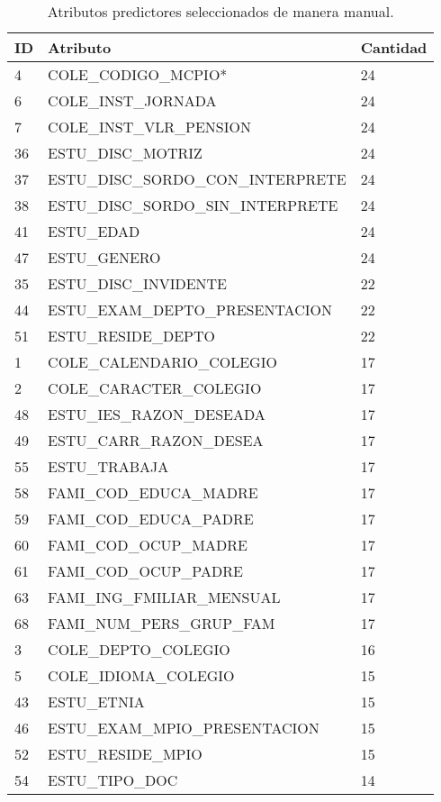 \begin{table}[!Hhtb]
\centering
\begin{tabular}{|p{0.5cm}|p{8cm}|p{1.8cm}|}
\hline
	\rowcolor[gray]{0.9} 
	\textbf{ID} &
	\textbf{Atributo} &
	\textbf{Cantidad}\\
\hline
4 & COLE_CODIGO_MCPIO* & 24 \\ \hline
6 & COLE\_INST\_JORNADA & 24 \\ \hline
7 & COLE\_INST\_VLR\_PENSION & 24 \\ \hline
36 & ESTU\_DISC\_MOTRIZ & 24 \\ \hline
37 & ESTU\_DISC\_SORDO\_CON\_INTERPRETE & 24 \\ \hline
38 & ESTU\_DISC\_SORDO\_SIN\_INTERPRETE & 24 \\ \hline
41 & ESTU\_EDAD & 24 \\ \hline
47 & ESTU\_GENERO & 24 \\ \hline
35 & ESTU\_DISC\_INVIDENTE & 22 \\ \hline
44 & ESTU\_EXAM\_DEPTO\_PRESENTACION & 22 \\ \hline
51 & ESTU\_RESIDE\_DEPTO & 22 \\ \hline
1 & COLE\_CALENDARIO\_COLEGIO & 17 \\ \hline
2 & COLE\_CARACTER\_COLEGIO & 17 \\ \hline
48 & ESTU\_IES\_RAZON\_DESEADA & 17 \\ \hline
49 & ESTU\_CARR\_RAZON\_DESEA & 17 \\ \hline
55 & ESTU\_TRABAJA & 17 \\ \hline
58 & FAMI\_COD\_EDUCA\_MADRE & 17 \\ \hline
59 & FAMI\_COD\_EDUCA\_PADRE & 17 \\ \hline
60 & FAMI\_COD\_OCUP\_MADRE & 17 \\ \hline
61 & FAMI\_COD\_OCUP\_PADRE & 17 \\ \hline
63 & FAMI\_ING\_FMILIAR\_MENSUAL & 17 \\ \hline
68 & FAMI\_NUM\_PERS\_GRUP\_FAM & 17 \\ \hline
3 & COLE\_DEPTO\_COLEGIO & 16 \\ \hline
5 & COLE\_IDIOMA\_COLEGIO & 15 \\ \hline
43 & ESTU\_ETNIA & 15 \\ \hline
46 & ESTU\_EXAM\_MPIO\_PRESENTACION & 15 \\ \hline
52 & ESTU\_RESIDE\_MPIO & 15 \\ \hline
54 & ESTU\_TIPO\_DOC & 14 \\ \hline
\end{tabular}
\caption{Atributos predictores seleccionados de manera manual.}
\label{tab:cuadro15}
\end{table}
